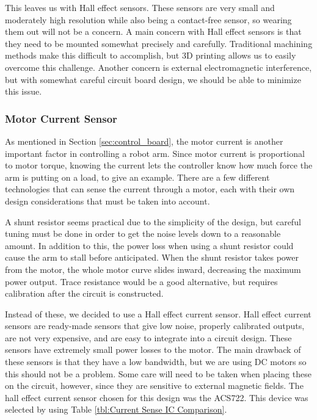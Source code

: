 \noindent This leaves us with Hall effect sensors. These sensors are very small and moderately high resolution while also being a contact-free sensor, so wearing them out will not be a concern. A main concern with Hall effect sensors is that they need to be mounted somewhat precisely and carefully. Traditional machining methods make this difficult to accomplish, but 3D printing allows us to easily overcome this challenge.  Another concern is external electromagnetic interference, but with somewhat careful circuit board design, we should be able to minimize this issue.

\subsubsection{Motor Current Sensor}
As mentioned in Section \ref{sec:control_board}, the motor current is another important factor in controlling a robot arm. Since motor current is proportional to motor torque, knowing the current lets the controller know how much force the arm is putting on a load, to give an example. There are a few different technologies that can sense the current through a motor, each with their own design considerations that must be taken into account.

\noindent A shunt resistor seems practical due to the simplicity of the design, but careful tuning must be done in order to get the noise levels down to a reasonable amount. In addition to this, the power loss when using a shunt resistor could cause the arm to stall before anticipated. When the shunt resistor takes power from the motor, the whole motor curve slides inward, decreasing the maximum power output. Trace resistance would be a good alternative, but requires calibration after the circuit is constructed. 

\noindent Instead of these, we decided to use a Hall effect current sensor. Hall effect current sensors are ready-made sensors that give low noise, properly calibrated outputs, are not very expensive, and are easy to integrate into a circuit design. These sensors have extremely small power losses to the motor. The main drawback of these sensors is that they have a low bandwidth, but we are using DC motors so this should not be a problem. Some care will need to be taken when placing these on the circuit, however, since they are sensitive to external magnetic fields. The hall effect current sensor chosen for this design was the ACS722. This device was selected by using Table \ref{tbl:Current Sense IC Comparison}.

